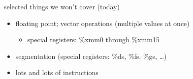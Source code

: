 
\begin{frame}{selected things we won't cover (today)}
    \begin{itemize}
        \item floating point; vector operations (multiple values at once)
            \begin{itemize}
            \item special registers: \%xmm0 through \%xmm15
            \end{itemize}
        \item segmentation (special registers: \%ds, \%fs, \%gs, \ldots)
        \item lots and lots of instructions
    \end{itemize}
\end{frame}

